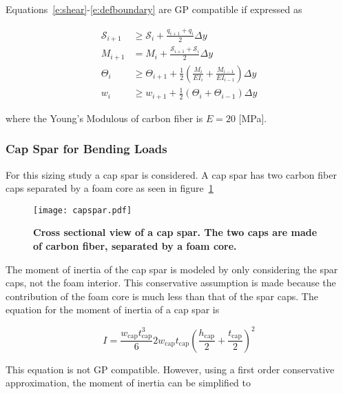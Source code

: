 \documentclass[]{aiaa-tc}%
\begin{document}
Equations~\ref{e:shear}-\ref{e:defboundary} are GP compatible if expressed as

\begin{align}
    \label{e:sheargp}
    \mathcal{S}_{i+1} &\geq \mathcal{S}_i + \frac{q_{i+1} + q_i}{2} \Delta y \\
    \label{e:momentgp}
    M_{i+1} &= M_i + \frac{\mathcal{S}_{i+1} + \mathcal{S}_i}{2} \Delta y \\
    \label{e:anglegp}
    \Theta_{i} &\geq \Theta_{i+1} + \frac{1}{2} \left(\frac{M_i}{EI_i} + \frac{M_{i-1}}{EI_{i-1}} \right) \Delta y \\
    \label{e:deflection}
    w_{i} &\geq w_{i+1} + \frac{1}{2} (\Theta_i + \Theta_{i-1}) \Delta y 
\end{align}

where the Young's Modulous of carbon fiber is $E = 20$ [MPa]. 

\subsubsection{Cap Spar for Bending Loads}

For this sizing study a cap spar is considered.  A cap spar has two carbon fiber caps separated by a foam core as seen in figure~\ref{f:capspar}

\begin{figure}[H]
	\begin{center}
	\texttt{[image: capspar.pdf]}
    \caption{ \textbf{ Cross sectional view of a cap spar.  The two caps are made of carbon fiber, separated by a foam core.}}
	\label{f:capspar}
	\end{center}
\end{figure}

The moment of inertia of the cap spar is modeled by only considering the spar caps, not the foam interior.  
This conservative assumption is made because the contribution of the foam core is much less than that of the spar caps.  
The equation for the moment of inertia\cite{bending} of a cap spar is 

\begin{equation}
    \label{e:moispar}
    I = \frac{w_{\text{cap}}t_{\text{cap}}^3}{6} 2w_{\text{cap}}t_{\text{cap}}\left( \frac{h_{\text{cap}}}{2} + \frac{t_{\text{cap}}}{2} \right)^2
\end{equation}

This equation is not GP compatible.  However, using a first order conservative approximation, the moment of inertia can be simplified to 
\end{document}
